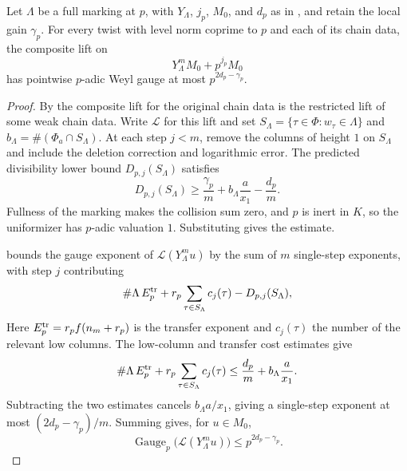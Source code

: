 \begin{lemma}
\label{lem:a-full-mark-valuation}
\emitthmsource
Let $\Lambda$ be a full marking at $p$, with $Y_\Lambda$, $j_p$, $M_0$, and $d_p$ as in , and retain the local gain $\gamma_p$. For every twist with level norm coprime to $p$ and each of its chain data, the composite lift on
\[
 Y_\Lambda^m M_0+p^{j_p}M_0
\]
has pointwise $p$-adic Weyl gauge at most $p^{2d_p-\gamma_p}$.
\end{lemma}
\begin{proof}
By  the composite lift for the original chain data is the restricted lift of some weak chain data. Write $\mathcal L$ for this lift and set $S_\Lambda=\{\tau\in\Phi:w_\tau\in\Lambda\}$ and $b_\Lambda=\#(\Phi_a\cap S_\Lambda)$. At each step $j<m$, remove the columns of height $1$ on $S_\Lambda$ and include the deletion correction and logarithmic error. The predicted divisibility lower bound $D_{p,j}(S_\Lambda)$ satisfies
\[
 D_{p,j}(S_\Lambda)
 \ge \frac{\gamma_p}{m}+b_\Lambda\frac{a}{x_1}-\frac{d_p}{m}.
\]
Fullness of the marking makes the collision sum zero, and $p$ is inert in $K$, so the uniformizer has $p$-adic valuation $1$. Substituting gives the estimate.

 bounds the gauge exponent of $\mathcal L(Y_\Lambda^m u)$ by the sum of $m$ single-step exponents, with step $j$ contributing
\[
 \#\Lambda\,E_p^{\rm tr}
 +r_p\sum_{\tau\in S_\Lambda}c_j(\tau)-D_{p,j}(S_\Lambda),
\]
Here $E_p^{\rm tr}=r_p f(n_m+r_p)$ is the transfer exponent and $c_j(\tau)$ the number of the relevant low columns. The low-column and transfer cost estimates give
\[
 \#\Lambda\,E_p^{\rm tr}+r_p\sum_{\tau\in S_\Lambda}c_j(\tau)
     \le \frac{d_p}{m}+b_\Lambda\frac a{x_1}.
\]
Subtracting the two estimates cancels $b_\Lambda a/x_1$, giving a single-step exponent at most $(2d_p-\gamma_p)/m$. Summing gives, for $u\in M_0$,
\[
 \operatorname{Gauge}_p\bigl(\mathcal L(Y_\Lambda^m u)\bigr)
 \le p^{2d_p-\gamma_p}.
\]


\end{proof}
